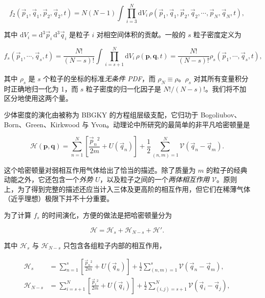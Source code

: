 \begin{equation}\label{eq:3.17}
  f_2(\vec p_1,\vec q_1,\vec p_2,\vec q_2,t)=N(N-1)\int\prod_{i=3}^N \mathrm{d}V_i\,\rho(\vec p_1,\vec q_1,\vec p_2,\vec q_2,\cdots,\vec p_N,\vec q_N,t),
\end{equation}

其中 $\mathrm{d}V_i=\mathrm{d}^3\vec p_i\,\mathrm{d}^3\vec q_i$ 是粒子 $i$ 对相空间体积的贡献。一般的 $s$ 粒子密度定义为

\begin{equation}\label{eq:3.18}
  f_s(\vec p_1,\cdots,\vec q_s,t)=\frac{N!}{(N-s)!}\int\prod_{i=s+1}^N \mathrm{d}V_i\,\rho(\bm p,\bm q,t)=\frac{N!}{(N-s)!}\rho_s(\vec p_1,\cdots,\vec q_s,t),
\end{equation}

其中 $\rho_s$ 是 $s$ 个粒子的坐标的标准\emph{无条件 PDF}，而 $\rho_N\equiv\rho$。$\rho_s$ 对其所有变量积分时正确地归一化为 1，而 $s$ 粒子密度的归一化因子是 $N!/(N-s)!$。我们将不加区分地使用这两个量。

少体密度的演化由被称为 BBGKY 的方程组层级支配，它归功于 Bogoliubov、Born、Green、Kirkwood 与 Yvon。动理论中所研究的最简单的非平凡哈密顿量是

\begin{equation}\label{eq:3.19}
  \mathscr H(\bm p,\bm q)=\sum_{n=1}^N\left[\frac{\vec p_n{}^2}{2m}+U(\vec q_n)\right]+\frac12\sum_{(n,m)=1}^N\mathscr V(\vec q_n-\vec q_m).
\end{equation}

这个哈密顿量对弱相互作用气体给出了恰当的描述。除了质量为 $m$ 的粒子的经典动能之外，它还包含一个\emph{外势} $U$，以及粒子之间的一个\emph{两体相互作用} $\mathscr V$。原则上，为了得到完整的描述还应当计入三体及更高阶的相互作用，但它们在稀薄气体（近乎理想）极限下并不十分重要。

为了计算 $f_s$ 的时间演化，方便的做法是把哈密顿量分为

\begin{equation}\label{eq:3.20}
  \mathscr H=\mathscr H_s+\mathscr H_{N-s}+\mathscr H'.
\end{equation}

其中 $\mathscr H_s$ 与 $\mathscr H_{N-s}$ 只包含各组粒子内部的相互作用，

\begin{equation}\label{eq:3.21}
  \begin{aligned}
    \mathscr H_s&=\sum_{n=1}^s\left[\frac{\vec p_n{}^2}{2m}+U(\vec q_n)\right]+\frac12\sum_{(n,m)=1}^s\mathscr V(\vec q_n-\vec q_m),\\
    \mathscr H_{N-s}&=\sum_{i=s+1}^N\left[\frac{\vec p_i{}^2}{2m}+U(\vec q_i)\right]+\frac12\sum_{(i,j)=s+1}^N\mathscr V(\vec q_i-\vec q_j),
  \end{aligned}
\end{equation}

